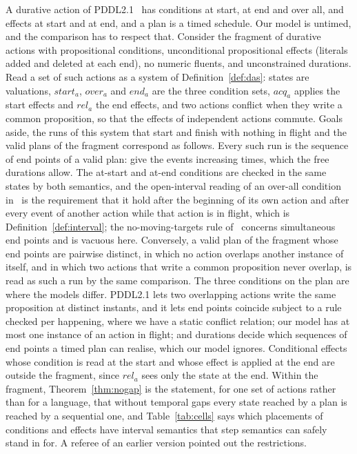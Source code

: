 \documentclass[preprint,12pt]{elsarticle}
\theoremstyle{plain}
\theoremstyle{definition}
\newcommand{\st}{\mathit{start}}
\newcommand{\ovr}{\mathit{over}}
\newcommand{\stp}{\mathit{end}}
\newcommand{\acq}{\mathit{acq}}
\newcommand{\rel}{\mathit{rel}}
\begin{document}
A durative action of PDDL2.1~\cite{FoxLong2003} has conditions at start, at end and over all, and effects at start and at end, and a plan is a timed schedule. Our model is untimed, and the comparison has to respect that. Consider the fragment of durative actions with propositional conditions, unconditional propositional effects (literals added and deleted at each end), no numeric fluents, and unconstrained durations. Read a set of such actions as a system of Definition~\ref{def:das}: states are valuations, $\st_a$, $\ovr_a$ and $\stp_a$ are the three condition sets, $\acq_a$ applies the start effects and $\rel_a$ the end effects, and two actions conflict when they write a common proposition, so that the effects of independent actions commute. Goals aside, the runs of this system that start and finish with nothing in flight and the valid plans of the fragment correspond as follows. Every such run is the sequence of end points of a valid plan: give the events increasing times, which the free durations allow. The at-start and at-end conditions are checked in the same states by both semantics, and the open-interval reading of an over-all condition in~\cite{FoxLong2003} is the requirement that it hold after the beginning of its own action and after every event of another action while that action is in flight, which is Definition~\ref{def:interval}; the no-moving-targets rule of~\cite[Def.~12]{FoxLong2003} concerns simultaneous end points and is vacuous here. Conversely, a valid plan of the fragment whose end points are pairwise distinct, in which no action overlaps another instance of itself, and in which two actions that write a common proposition never overlap, is read as such a run by the same comparison. The three conditions on the plan are where the models differ. PDDL2.1 lets two overlapping actions write the same proposition at distinct instants, and it lets end points coincide subject to a rule checked per happening, where we have a static conflict relation; our model has at most one instance of an action in flight; and durations decide which sequences of end points a timed plan can realise, which our model ignores. Conditional effects whose condition is read at the start and whose effect is applied at the end are outside the fragment, since $\rel_a$ sees only the state at the end. Within the fragment, Theorem~\ref{thm:nogap} is the statement, for one set of actions rather than for a language, that without temporal gaps every state reached by a plan is reached by a sequential one, and Table~\ref{tab:cells} says which placements of conditions and effects have interval semantics that step semantics can safely stand in for. A referee of an earlier version pointed out the restrictions.
\end{document}
